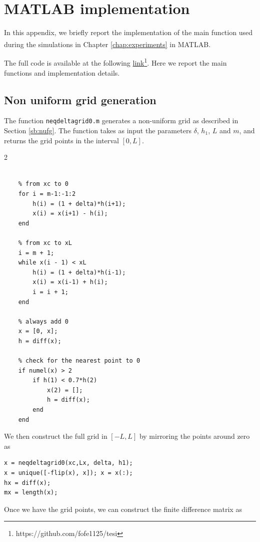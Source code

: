 \chapter{MATLAB\textsuperscript{\textregistered} implementation}

In this appendix, we briefly report the implementation of the main function used during the simulations in Chapter \ref{chap:experiments} in MATLAB\textsuperscript{\textregistered}.

The full code is available at the following \href{https://github.com/fofe1125/tesi}{link}\footnote{https://github.com/fofe1125/tesi}. Here we report the main functions and implementation details.

\section*{Non uniform grid generation}

The function \texttt{neqdeltagrid0.m} generates a non-uniform grid as described in Section \ref{sb:nufg}. The function takes as input the parameters $\delta$, $h_1$, $L$ and $m$, and returns the grid points in the interval $[0, L]$.

\begin{multicols}{2}
    \begin{lstlisting}

    % from xc to 0
    for i = m-1:-1:2
        h(i) = (1 + delta)*h(i+1);
        x(i) = x(i+1) - h(i);
    end

    % from xc to xL
    i = m + 1;
    while x(i - 1) < xL
        h(i) = (1 + delta)*h(i-1);
        x(i) = x(i-1) + h(i);
        i = i + 1;
    end

    % always add 0
    x = [0, x];
    h = diff(x);

    % check for the nearest point to 0
    if numel(x) > 2
        if h(1) < 0.7*h(2)
            x(2) = [];
            h = diff(x);
        end
    end

    \end{lstlisting}
\end{multicols}

We then construct the full grid in $[-L, L]$ by mirroring the points around zero as

\begin{lstlisting}
x = neqdeltagrid0(xc,Lx, delta, h1);
x = unique([-flip(x), x]); x = x(:);
hx = diff(x);
mx = length(x);
\end{lstlisting}

Once we have the grid points, we can construct the finite difference matrix as 


